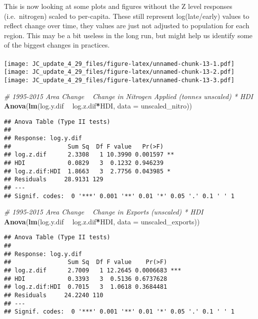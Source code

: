 \documentclass[
]{article}
\newenvironment{Shaded}{\begin{snugshade}}{\end{snugshade}}
\newcommand{\CommentTok}[1]{\textcolor[rgb]{0.56,0.35,0.01}{\textit{#1}}}
\newcommand{\DataTypeTok}[1]{\textcolor[rgb]{0.13,0.29,0.53}{#1}}
\newcommand{\KeywordTok}[1]{\textcolor[rgb]{0.13,0.29,0.53}{\textbf{#1}}}
\newcommand{\NormalTok}[1]{#1}
\newcommand{\OperatorTok}[1]{\textcolor[rgb]{0.81,0.36,0.00}{\textbf{#1}}}
\newcommand{\StringTok}[1]{\textcolor[rgb]{0.31,0.60,0.02}{#1}}
\begin{document}
This is now looking at some plots and figures without the Z level
responses (i.e.~nitrogen) scaled to per-capita. These still represent
log(late/early) values to reflect change over time, they values are just
not adjusted to population for each region. This may be a bit useless in
the long run, but might help us identify some of the biggest changes in
practices.

\hypertarget{section-2}{%
\paragraph{}\label{section-2}}

\texttt{[image: JC\_update\_4\_29\_files/figure-latex/unnamed-chunk-13-1.pdf]}
\texttt{[image: JC\_update\_4\_29\_files/figure-latex/unnamed-chunk-13-2.pdf]}
\texttt{[image: JC\_update\_4\_29\_files/figure-latex/unnamed-chunk-13-3.pdf]}

\begin{Shaded}
\begin{Highlighting}[]
\CommentTok{# 1995-2015 Area Change ~ Change in Nitrogen Applied (tonnes unscaled) * HDI}
\KeywordTok{Anova}\NormalTok{(}\KeywordTok{lm}\NormalTok{(log.y.dif }\OperatorTok{~}\StringTok{ }\NormalTok{log.z.dif}\OperatorTok{*}\NormalTok{HDI, }\DataTypeTok{data =}\NormalTok{ unscaled_nitro))}
\end{Highlighting}
\end{Shaded}

\begin{verbatim}
## Anova Table (Type II tests)
## 
## Response: log.y.dif
##                Sum Sq  Df F value   Pr(>F)   
## log.z.dif      2.3308   1 10.3990 0.001597 **
## HDI            0.0829   3  0.1232 0.946239   
## log.z.dif:HDI  1.8663   3  2.7756 0.043985 * 
## Residuals     28.9131 129                    
## ---
## Signif. codes:  0 '***' 0.001 '**' 0.01 '*' 0.05 '.' 0.1 ' ' 1
\end{verbatim}

\begin{Shaded}
\begin{Highlighting}[]
\CommentTok{# 1995-2015 Area Change ~ Change in Exports (unscaled) * HDI}
\KeywordTok{Anova}\NormalTok{(}\KeywordTok{lm}\NormalTok{(log.y.dif }\OperatorTok{~}\StringTok{ }\NormalTok{log.z.dif}\OperatorTok{*}\NormalTok{HDI, }\DataTypeTok{data =}\NormalTok{ unscaled_exports))}
\end{Highlighting}
\end{Shaded}

\begin{verbatim}
## Anova Table (Type II tests)
## 
## Response: log.y.dif
##                Sum Sq  Df F value    Pr(>F)    
## log.z.dif      2.7009   1 12.2645 0.0006683 ***
## HDI            0.3393   3  0.5136 0.6737628    
## log.z.dif:HDI  0.7015   3  1.0618 0.3684481    
## Residuals     24.2240 110                      
## ---
## Signif. codes:  0 '***' 0.001 '**' 0.01 '*' 0.05 '.' 0.1 ' ' 1
\end{verbatim}
\end{document}
